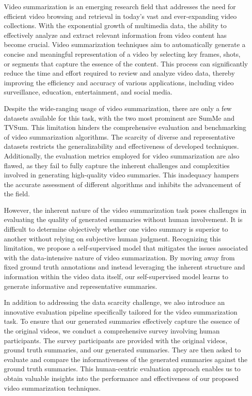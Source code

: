 \begin{EnAbstract}
  Video summarization is an emerging research field that addresses the need for efficient video browsing and retrieval in today's vast and ever-expanding video collections. With the exponential growth of multimedia data, the ability to effectively analyze and extract relevant information from video content has become crucial. Video summarization techniques aim to automatically generate a concise and meaningful representation of a video by selecting key frames, shots, or segments that capture the essence of the content. This process can significantly reduce the time and effort required to review and analyze video data, thereby improving the efficiency and accuracy of various applications, including video surveillance, education, entertainment, and social media.
  
  Despite the wide-ranging usage of video summarization, there are only a few datasets available for this task, with the two most prominent are SumMe\cite{SumMe} and TVSum\cite{TVSum}. This limitation hinders the comprehensive evaluation and benchmarking of video summarization algorithms. The scarcity of diverse and representative datasets restricts the generalizability and effectiveness of developed techniques. Additionally, the evaluation metrics employed for video summarization are also flawed, as they fail to fully capture the inherent challenges and complexities involved in generating high-quality video summaries. This inadequacy hampers the accurate assessment of different algorithms and inhibits the advancement of the field.

  However, the inherent nature of the video summarization task poses challenges in evaluating the quality of generated summaries without human involvement. It is difficult to determine objectively whether one video summary is superior to another without relying on subjective human judgment. Recognizing this limitation, we propose a self-supervised model that mitigates the issues associated with the data-intensive nature of video summarization. By moving away from fixed ground truth annotations and instead leveraging the inherent structure and information within the video data itself, our self-supervised model learns to generate informative and representative summaries.

  In addition to addressing the data scarcity challenge, we also introduce an innovative evaluation pipeline specifically tailored for the video summarization task. To ensure that our generated summaries effectively capture the essence of the original videos, we conduct a comprehensive survey involving human participants. The survey participants are provided with the original videos, ground truth summaries, and our generated summaries. They are then asked to evaluate and compare the informativeness of the generated summaries against the ground truth summaries. This human-centric evaluation approach enables us to obtain valuable insights into the performance and effectiveness of our proposed video summarization techniques.


\end{EnAbstract}
